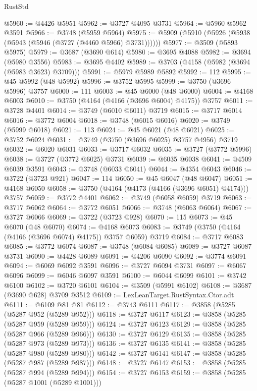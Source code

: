 \begin{lexlean}{RustStd}
\begin{coremodule}
@5960 := @4426 @5951
@5962 := @3727 @4095 @3731
@5964 := @5960 @5962 @3591
@5966 := @3748 (@5959 @5964)
@5975 := @5909 (@5910 (@5926 (@5938 (@5943 (@5946 (@3727 (@4460 @5966) @3731))))))
@5977 := @3509 (@5893 @5975)
@5979 := @3687 (@3690 @614)
@5980 := @3695 @4088
@5982 := @3694 (@5980 @3556)
@5983 := @3695 @4402
@5989 := @3703 (@4158 (@5982 (@3694 (@5983 @3623) @3709)))
@5991 := @5979 @5989 @5892
@5992 := 112
@5995 := @45 @5992 (@48 @5992)
@5996 := @3752 @5995
@5999 := @3750 (@3696 @5996) @3757
@6000 := 111
@6003 := @45 @6000 (@48 @6000)
@6004 := @4168 @6003
@6010 := @3750 (@4164 (@4166 (@3696 @6004) @4175)) @3757
@6011 := @3728 @4401
@6014 := @3749 (@6010 @6011) @3719
@6015 := @3717 @6014
@6016 := @3772 @6004
@6018 := @3748 (@6015 @6016)
@6020 := @3749 (@5999 @6018)
@6021 := 113
@6024 := @45 @6021 (@48 @6021)
@6025 := @3752 @6024
@6031 := @3749 (@3750 (@3696 @6025) @3757 @4956) @3719
@6032 := @6020 @6031
@6033 := @3717 @6032
@6035 := @3727 (@3772 @5996)
@6038 := @3727 (@3772 @6025) @3731
@6039 := @6035 @6038
@6041 := @4509 @6039 @3591
@6043 := @3748 (@6033 @6041)
@6044 := @4354 @6043
@6046 := @3722 (@3723 @921)
@6047 := 114
@6050 := @45 @6047 (@48 @6047)
@6051 := @4168 @6050
@6058 := @3750 (@4164 (@4173 (@4166 (@3696 @6051) @4174))) @3757
@6059 := @3772 @4401
@6062 := @3749 (@6058 @6059) @3719
@6063 := @3717 @6062
@6064 := @3772 @6051
@6066 := @3748 (@6063 @6064)
@6067 := @3727 @6066
@6069 := @3722 (@3723 @928)
@6070 := 115
@6073 := @45 @6070 (@48 @6070)
@6074 := @4168 @6073
@6083 := @3749 (@3750 (@4164 (@4166 (@3696 @6074) @4175)) @3757 @6059) @3719
@6084 := @3717 @6083
@6085 := @3772 @6074
@6087 := @3748 (@6084 @6085)
@6089 := @3727 @6087 @3731
@6090 := @4428 @6089
@6091 := @4206 @6090
@6092 := @3774 @6091
@6094 := @6069 @6092 @3591
@6096 := @3727 @6094 @3731
@6097 := @6067 @6096
@6099 := @6046 @6097 @3591
@6100 := @6044 @6099
@6101 := @3742 @6100
@6102 := @3720 @6101
@6104 := @3509 (@5991 @6102)
@6108 := @3687 (@3690 @628) @3709 @3512
@6109 := LexLeanTarget.RustSyntax.Ctor.adt
@6111 := @6109 @81 @81
@6112 := @3743 @6111
@6117 := @3858 (@5285 (@5287 @952 (@5289 @952)))
@6118 := @3727 @6117
@6123 := @3858 (@5285 (@5287 @959 (@5289 @959)))
@6124 := @3727 @6123
@6129 := @3858 (@5285 (@5287 @966 (@5289 @966)))
@6130 := @3727 @6129
@6135 := @3858 (@5285 (@5287 @973 (@5289 @973)))
@6136 := @3727 @6135
@6141 := @3858 (@5285 (@5287 @980 (@5289 @980)))
@6142 := @3727 @6141
@6147 := @3858 (@5285 (@5287 @987 (@5289 @987)))
@6148 := @3727 @6147
@6153 := @3858 (@5285 (@5287 @994 (@5289 @994)))
@6154 := @3727 @6153
@6159 := @3858 (@5285 (@5287 @1001 (@5289 @1001)))

\end{coremodule}
\end{lexlean}

